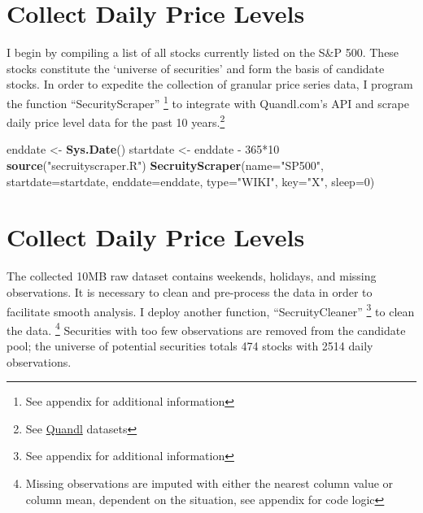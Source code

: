 \documentclass[]{elsarticle} %
\newenvironment{Shaded}{\begin{snugshade}}{\end{snugshade}}
\newcommand{\KeywordTok}[1]{\textcolor[rgb]{0.13,0.29,0.53}{\textbf{{#1}}}}
\newcommand{\DataTypeTok}[1]{\textcolor[rgb]{0.13,0.29,0.53}{{#1}}}
\newcommand{\DecValTok}[1]{\textcolor[rgb]{0.00,0.00,0.81}{{#1}}}
\newcommand{\StringTok}[1]{\textcolor[rgb]{0.31,0.60,0.02}{{#1}}}
\newcommand{\NormalTok}[1]{{#1}}
\begin{document}
\section{Collect Daily Price Levels}\label{collect-daily-price-levels}

I begin by compiling a list of all stocks currently listed on the S\&P
500. These stocks constitute the `universe of securities' and form the
basis of candidate stocks. In order to expedite the collection of
granular price series data, I program the function ``SecurityScraper''
\footnote{See appendix for additional information} to integrate with
Quandl.com's API and scrape daily price level data for the past 10
years.\footnote{See \href{https://www.quandl.com/data/WIKI}{Quandl}
  datasets}

\begin{Shaded}
\begin{Highlighting}[]
\NormalTok{enddate <-}\StringTok{ }\KeywordTok{Sys.Date}\NormalTok{()}
\NormalTok{startdate <-}\StringTok{ }\NormalTok{enddate -}\StringTok{ }\DecValTok{365}\NormalTok{*}\DecValTok{10} 
\KeywordTok{source}\NormalTok{(}\StringTok{"secruityscraper.R"}\NormalTok{)}
\KeywordTok{SecruityScraper}\NormalTok{(}\DataTypeTok{name=}\StringTok{"SP500"}\NormalTok{, }
                \DataTypeTok{startdate=}\NormalTok{startdate, }
                \DataTypeTok{enddate=}\NormalTok{enddate, }\DataTypeTok{type=}\StringTok{"WIKI"}\NormalTok{, }
                \DataTypeTok{key=}\StringTok{"X"}\NormalTok{, }\DataTypeTok{sleep=}\DecValTok{0}\NormalTok{)}
\end{Highlighting}
\end{Shaded}

\section{Collect Daily Price Levels}\label{collect-daily-price-levels-1}

The collected 10MB raw dataset contains weekends, holidays, and missing
observations. It is necessary to clean and pre-process the data in order
to facilitate smooth analysis. I deploy another function,
``SecruityCleaner'' \footnote{See appendix for additional information}
to clean the data. \footnote{Missing observations are imputed with
  either the nearest column value or column mean, dependent on the
  situation, see appendix for code logic} Securities with too few
observations are removed from the candidate pool; the universe of
potential securities totals 474 stocks with 2514 daily observations.
\end{document}

